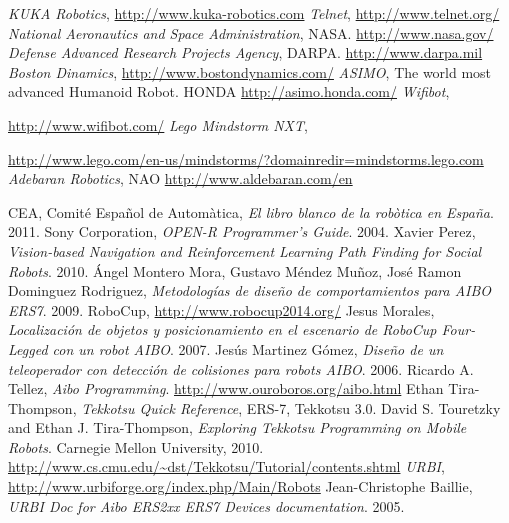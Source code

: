 \documentclass[12pt,a4paper,final,twoside]{article}
\begin{document}
\newpage
\clearpage
{}
\begin{thebibliography}{99}
	\emph{KUKA Robotics},
	\url{http://www.kuka-robotics.com}
	\emph{Telnet},
	\url{http://www.telnet.org/}
	\emph{National Aeronautics and Space Administration},
	NASA.
	\url{http://www.nasa.gov/}
	\emph{Defense Advanced Research Projects Agency},
	DARPA.
	\url{http://www.darpa.mil}
	\emph{Boston Dinamics},
	\url{http://www.bostondynamics.com/}
	\emph{ASIMO}, 
	The world most advanced Humanoid Robot.
	HONDA
	\url{http://asimo.honda.com/}
	\emph{Wifibot}, 
	
	\url{http://www.wifibot.com/}
	\emph{Lego Mindstorm NXT}, 
	
	\url{http://www.lego.com/en-us/mindstorms/?domainredir=mindstorms.lego.com}
	\emph{Adebaran Robotics},
	NAO
	\url{http://www.aldebaran.com/en}

	CEA, Comité Español de Automàtica,
	\emph{El libro blanco de la robòtica en España}.
	2011.
  Sony Corporation,
  \emph{OPEN-R Programmer's Guide}.
  2004.
	Xavier Perez,
	\emph{Vision-based Navigation and Reinforcement Learning Path Finding for Social Robots}.
	2010.
	Ángel Montero Mora, Gustavo Méndez Muñoz, José Ramon Dominguez Rodriguez,
	\emph{Metodologías de diseño de comportamientos para AIBO ERS7}.
	2009.
	RoboCup, \url{http://www.robocup2014.org/}
	Jesus Morales,
	\emph{Localización de objetos y posicionamiento en el escenario de RoboCup Four-Legged con un robot AIBO}.
	2007.  
	Jesús Martinez Gómez, 
	\emph{Diseño de un teleoperador con detección de colisiones para robots AIBO}. 			2006.
	Ricardo A. Tellez,
	\emph{Aibo Programming}.
	\url{http://www.ouroboros.org/aibo.html}
	Ethan Tira-Thompson,
	\emph{Tekkotsu Quick Reference}, ERS-7, Tekkotsu 3.0.
	David S. Touretzky and Ethan J. Tira-Thompson, 
	\emph{Exploring Tekkotsu Programming on Mobile Robots}.
	Carnegie Mellon University,
	2010.
	\url{http://www.cs.cmu.edu/~dst/Tekkotsu/Tutorial/contents.shtml}
	\emph{URBI},
	\url{http://www.urbiforge.org/index.php/Main/Robots}
	Jean-Christophe Baillie,
	\emph{URBI Doc for Aibo ERS2xx ERS7 Devices documentation}.
	2005.
	
\end{thebibliography}
\end{document}
